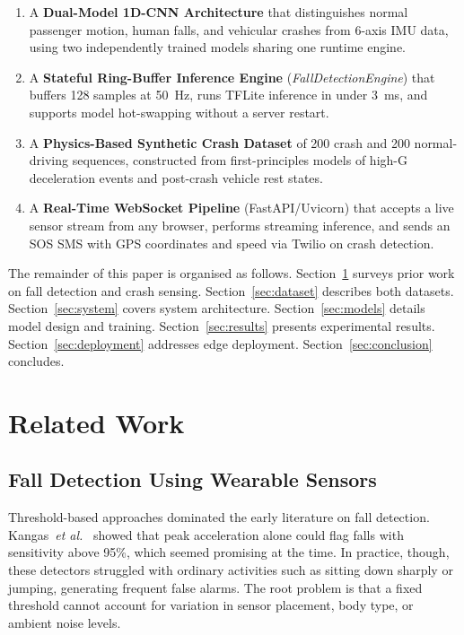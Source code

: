 \documentclass[journal]{IEEEtran}
\begin{document}
\begin{enumerate}
  \item A \textbf{Dual-Model 1D-CNN Architecture} that distinguishes normal
        passenger motion, human falls, and vehicular crashes from 6-axis IMU
        data, using two independently trained models sharing one runtime engine.

  \item A \textbf{Stateful Ring-Buffer Inference Engine}
        (\textit{FallDetectionEngine}) that buffers 128 samples at 50~Hz, runs
        TFLite inference in under 3~ms, and supports model hot-swapping without
        a server restart.

  \item A \textbf{Physics-Based Synthetic Crash Dataset} of 200 crash and 200
        normal-driving sequences, constructed from first-principles models of
        high-G deceleration events and post-crash vehicle rest states.

  \item A \textbf{Real-Time WebSocket Pipeline} (FastAPI/Uvicorn) that accepts
        a live sensor stream from any browser, performs streaming inference, and
        sends an SOS SMS with GPS coordinates and speed via Twilio on crash
        detection.
\end{enumerate}

The remainder of this paper is organised as follows.
Section~\ref{sec:related} surveys prior work on fall detection and crash
sensing. Section~\ref{sec:dataset} describes both datasets.
Section~\ref{sec:system} covers system architecture.
Section~\ref{sec:models} details model design and training.
Section~\ref{sec:results} presents experimental results.
Section~\ref{sec:deployment} addresses edge deployment.
Section~\ref{sec:conclusion} concludes.


\section{Related Work}
\label{sec:related}

\subsection{Fall Detection Using Wearable Sensors}
Threshold-based approaches dominated the early literature on fall detection.
Kangas~\textit{et al.}~\cite{kangas2008} showed that peak acceleration alone
could flag falls with sensitivity above 95\%, which seemed promising at the
time. In practice, though, these detectors struggled with ordinary activities
such as sitting down sharply or jumping, generating frequent false alarms.
The root problem is that a fixed threshold cannot account for variation in
sensor placement, body type, or ambient noise levels.
\end{document}
